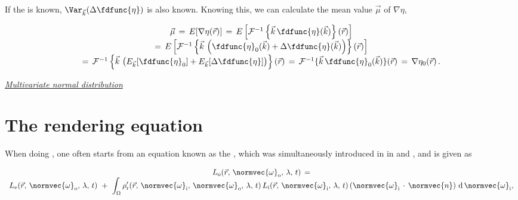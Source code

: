 {\HRule

If the  is known, $\Var_{\vec{k}}(\Delta\fdfunc{\eta})$ is also known. Knowing this, we can calculate the mean value $\vec{\mu}$ of $\nabla\eta$,

\begin{equation}
\begin{array}{c}
\vec{\mu} \,=\, E[\nabla\eta(\vec{r})] \,=\, E\left[\mathcal{F}^{-1}\left\{\vec{k}\,\fdfunc{\eta}(\vec{k})\right\}(\vec{r})\right] \\
=\, E\left[\mathcal{F}^{-1}\left\{\vec{k}\,\left(\fdfunc{\eta}_0(\vec{k})+\Delta\fdfunc{\eta}(\vec{k})\right)\right\}(\vec{r})\right] \\
=\, \mathcal{F}^{-1}\left\{\vec{k}\,\left(E_{\vec{k}}[\fdfunc{\eta}_0]+E_{\vec{k}}[\Delta\fdfunc{\eta}]\right)\right\}(\vec{r}) \,=\, \mathcal{F}^{-1}\{\vec{k}\,\fdfunc{\eta}_0(\vec{k})\}(\vec{r}) \,=\, \nabla\eta_0(\vec{r})\,.
\end{array}
\end{equation}

\textit{\href{http://en.wikipedia.org/wiki/Multivariate\_normal\_distribution\#Non-degenerate\_case}{Multivariate normal distribution}}

\HRule





















\section{The rendering equation}

When doing , one often starts from an equation known as the , which was simultaneously introduced in  in \citep{temp} and \citep{temp}, and is given as

\begin{equation} \label{eq:rendering_equation_original}
\begin{array}{c}
L_{\text{o}}(\vec{r},\,\normvec{\omega}_{\text{o}},\, \lambda,\, t) \,= \\
\displaystyle L_{\text{e}}(\vec{r},\, \normvec{\omega}_{\text{o}},\, \lambda,\, t) \ + \ \int_\Omega \rho'_{\text{r}}(\vec{r},\, \normvec{\omega}_{\text{i}},\, \normvec{\omega}_{\text{o}},\, \lambda,\, t)\, L_{\text{i}}(\vec{r},\, \normvec{\omega}_{\text{i}},\, \lambda,\, t)\, (\normvec{\omega}_{\text{i}}\,\cdot\,\normvec{n})\, \operatorname d \normvec{\omega}_{\text{i}},
\end{array}
\end{equation}

}
